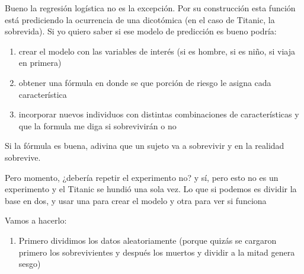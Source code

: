 \documentclass[
]{book}
\newenvironment{Shaded}{\begin{snugshade}}{\end{snugshade}}
\newcommand{\AttributeTok}[1]{\textcolor[rgb]{0.77,0.63,0.00}{#1}}
\newcommand{\CommentTok}[1]{\textcolor[rgb]{0.56,0.35,0.01}{\textit{#1}}}
\newcommand{\ConstantTok}[1]{\textcolor[rgb]{0.00,0.00,0.00}{#1}}
\newcommand{\DecValTok}[1]{\textcolor[rgb]{0.00,0.00,0.81}{#1}}
\newcommand{\FloatTok}[1]{\textcolor[rgb]{0.00,0.00,0.81}{#1}}
\newcommand{\FunctionTok}[1]{\textcolor[rgb]{0.00,0.00,0.00}{#1}}
\newcommand{\NormalTok}[1]{#1}
\newcommand{\OtherTok}[1]{\textcolor[rgb]{0.56,0.35,0.01}{#1}}
\newcommand{\SpecialCharTok}[1]{\textcolor[rgb]{0.00,0.00,0.00}{#1}}
\providecommand{\tightlist}{%
  \setlength{\itemsep}{0pt}\setlength{\parskip}{0pt}}
\begin{document}
Bueno la regresión logística no es la excepción. Por su construcción esta función está prediciendo la ocurrencia de una dicotómica (en el caso de Titanic, la sobrevida).
Si yo quiero saber si ese modelo de predicción es bueno podría:

\begin{enumerate}
\def\labelenumi{\arabic{enumi}.}
\item
  crear el modelo con las variables de interés (si es hombre, si es niño, si viaja en primera)
\item
  obtener una fórmula en donde se que porción de riesgo le asigna cada característica
\item
  incorporar nuevos individuos con distintas combinaciones de características y que la formula me diga si sobrevivirán o no
\end{enumerate}

Si la fórmula es buena, adivina que un sujeto va a sobrevivir y en la realidad sobrevive.

Pero momento, ¿debería repetir el experimento no? y sí, pero esto no es un experimento y el Titanic se hundió una sola vez. Lo que si podemos es dividir la base en dos, y usar una para crear el modelo y otra para ver si funciona

Vamos a hacerlo:

\begin{enumerate}
\def\labelenumi{\arabic{enumi}.}
\tightlist
\item
  Primero dividimos los datos aleatoriamente (porque quizás se cargaron primero los sobrevivientes y después los muertos y dividir a la mitad genera sesgo)
\end{enumerate}

\begin{Shaded}
\end{Shaded}
\end{document}
